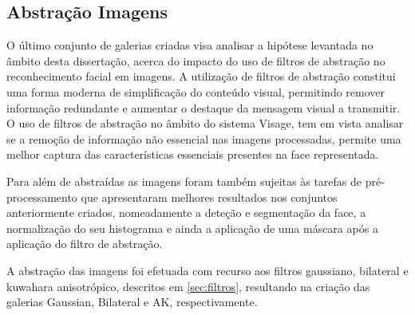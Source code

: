 \subsection{Abstração Imagens} \label{sec:pre-abstração}
O último conjunto de galerias criadas visa analisar a hipótese levantada no âmbito desta dissertação, acerca do impacto do uso de filtros de abstração no reconhecimento facial em imagens. A utilização de filtros de abstração constitui uma forma moderna de simplificação do conteúdo visual, permitindo remover informação redundante e aumentar o destaque da mensagem visual a transmitir. O uso de filtros de abstração no âmbito do sistema Visage, tem em vista analisar se a remoção de informação não essencial nas imagens processadas, permite uma melhor captura das características essenciais presentes na face representada. 

Para além de abstraídas as imagens foram também sujeitas às tarefas de pré-processamento que apresentaram melhores resultados nos conjuntos anteriormente criados, nomeadamente a deteção e segmentação da face, a normalização do seu histograma e ainda a aplicação de uma máscara após a aplicação do filtro de abstração.

A abstração das imagens foi efetuada com recurso aos filtros gaussiano, bilateral e kuwahara anisotrópico, descritos em \ref{sec:filtros}, resultando na criação das galerias Gaussian, Bilateral e AK, respectivamente.


